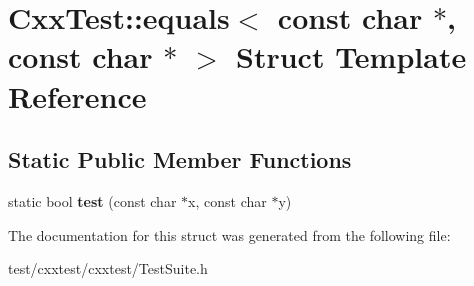 \hypertarget{structCxxTest_1_1equals_3_01const_01char_01_5_00_01const_01char_01_5_01_4}{\section{Cxx\-Test\-:\-:equals$<$ const char $\ast$, const char $\ast$ $>$ Struct Template Reference}
\label{structCxxTest_1_1equals_3_01const_01char_01_5_00_01const_01char_01_5_01_4}
}
\subsection*{Static Public Member Functions}
\begin{DoxyCompactItemize}
\item 
\hypertarget{structCxxTest_1_1equals_3_01const_01char_01_5_00_01const_01char_01_5_01_4_a8a51a5f3c3246e3808548f99c0f134cb}{static bool {\bfseries test} (const char $\ast$x, const char $\ast$y)}\label{structCxxTest_1_1equals_3_01const_01char_01_5_00_01const_01char_01_5_01_4_a8a51a5f3c3246e3808548f99c0f134cb}

\end{DoxyCompactItemize}


The documentation for this struct was generated from the following file\-:\begin{DoxyCompactItemize}
\item 
test/cxxtest/cxxtest/Test\-Suite.\-h\end{DoxyCompactItemize}
